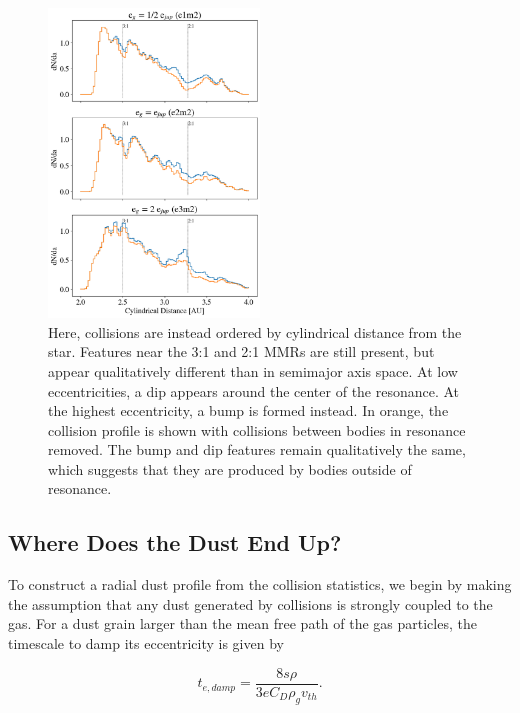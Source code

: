 \documentclass[twocolumn]{aastex63}
\begin{document}
\begin{figure}
\begin{center}
    \includegraphics[width=0.5\textwidth]{figures/coll_hist_r.png}
    \caption{Here, collisions are instead ordered by cylindrical distance from the star. Features near the 3:1 and 2:1 MMRs are still present, but appear qualitatively different than in semimajor axis space. At low eccentricities, a dip appears around the center of the resonance. At the highest eccentricity, a bump is formed instead. In orange, the collision profile is shown with collisions between bodies in resonance removed. The bump and dip features remain qualitatively the same, which suggests that they are produced by bodies outside of resonance.\label{fig:coll_hist_r}}
\end{center}
\end{figure}

\subsection{Where Does the Dust End Up?}

To construct a radial dust profile from the collision statistics, we begin by making the assumption that any dust generated by collisions is strongly 
coupled to the gas. For a dust grain larger than the mean free path of the gas particles, the timescale to damp its eccentricity is given by 
\citep{1976PThPh..56.1756A}

\begin{equation}\label{eq:t_edamp}
    t_{e, damp} = \frac{8 s \rho}{3 e C_{D} \rho_{g} v_{th}}.
\end{equation}
\end{document}
